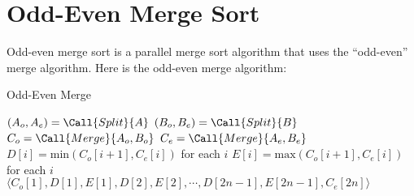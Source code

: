 \documentclass[11pt,a4paper,oneside,microtype,chapter,nokorean]{oblivoir}
\begin{document}
\section{Odd-Even Merge Sort}

Odd-even merge sort is a parallel merge sort algorithm that uses the ``odd-even'' merge algorithm.
Here is the odd-even merge algorithm:

\begin{algorithm}
  \caption{Odd-Even Merge}\label{odd-even-merge}
  \begin{algorithmic}[1]
     
    \State $(A_o, A_e) = \Call{Split}{A}$ 
    \State $(B_o, B_e) = \Call{Split}{B}$ 
    \State $C_o = \Call{Merge}{A_o,B_o}$
    \State $C_e = \Call{Merge}{A_e,B_e}$
    \State $D[i] = \textrm{min}(C_o[i+1],C_e[i])$ for each $i$
    \State $E[i] = \textrm{max}(C_o[i+1],C_e[i])$ for each $i$
    \State $\langle C_o[1], D[1], E[1], D[2], E[2], \cdots, D[2n-1], E[2n-1], C_e[2n] \rangle$
    \EndProcedure
  \end{algorithmic}
\end{algorithm}
\end{document}
